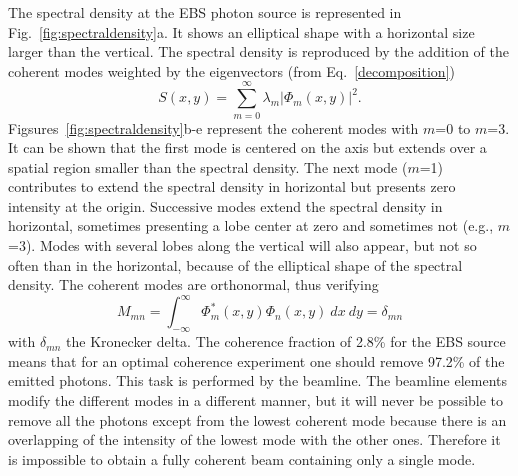 \documentclass{iucr}              %
\begin{document}
The spectral density at the EBS photon source is represented in Fig.~\ref{fig:spectraldensity}a. It shows an elliptical shape with a horizontal size larger than the vertical.  The spectral density is reproduced by the addition of the coherent modes weighted by the eigenvectors (from Eq.~\ref{decomposition})
\begin{equation}
S(x,y) = \sum_{m=0}^{\infty} \lambda_m |\Phi_m(x,y)|^2.
\end{equation}
Figsures~\ref{fig:spectraldensity}b-e represent the coherent modes with $m$=0 to $m$=3. It can be shown that the first mode is centered on the axis but extends over a spatial region smaller than the spectral density. The next mode ($m$=1) contributes to extend the spectral density in horizontal but presents zero intensity at the origin. Successive modes extend the spectral density in horizontal, sometimes presenting a lobe center at zero and sometimes not (e.g., $m$=3). Modes with several lobes along the vertical will also appear, but not so often than in the horizontal, because of the elliptical shape of the spectral density. The coherent modes are orthonormal, thus verifying 
\begin{equation}\label{eq:mode normalization}
M_{mn} = \int_{-\infty}^{\infty} \Phi^*_m(x,y) \Phi_n(x,y)~dx~dy = \delta_{mn}
\end{equation}
with $\delta_{mn}$ the Kronecker delta. The coherence fraction of 2.8\% for the EBS source means that for an optimal coherence experiment one should remove 97.2\% of the emitted photons. This task is performed by the beamline. The beamline elements modify the different modes in a different manner, but it will never be possible to remove all the photons except from the lowest coherent mode because there is an overlapping of the intensity of the lowest mode with the other ones. Therefore it is impossible to obtain a fully coherent beam containing only a single mode. 
\end{document}
